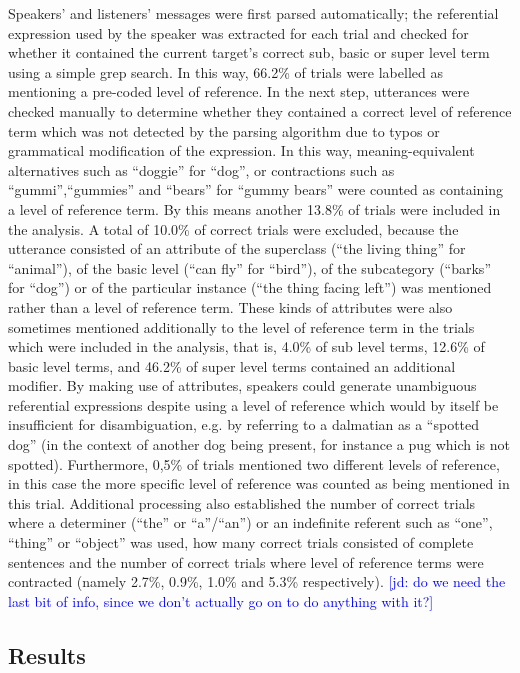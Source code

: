 \documentclass[10pt,letterpaper]{article}
\newcommand{\jd}[1]{\textcolor{Blue}{[jd: #1]}}
\begin{document}
Speakers' and listeners' messages were first parsed automatically; the referential expression used by the speaker was extracted for each trial and checked for whether it contained the current target's correct sub, basic or super level term using a simple grep search. In this way, 66.2\% of trials were labelled as mentioning a pre-coded level of reference. In the next step, utterances were checked manually to determine whether they contained a correct level of reference term which was not detected by the parsing algorithm due to typos or grammatical modification of the expression. In this way, meaning-equivalent alternatives such as ``doggie'' for ``dog'',  or contractions such as ``gummi'',``gummies'' and ``bears'' for ``gummy bears'' were counted as containing a level of reference term. By this means another 13.8\% of trials were included in the analysis. A total of 10.0\% of correct trials were excluded, because the utterance consisted of an attribute of the superclass (``the living thing'' for ``animal''), of the basic level (``can fly'' for ``bird''), of the subcategory (``barks'' for ``dog'') or of the  particular instance (``the thing facing left'') was mentioned rather than a level of reference term. These kinds of attributes were also sometimes mentioned additionally to the level of reference term in the trials which were included in the analysis, that is, 4.0\% of sub level terms, 12.6\% of basic level terms, and 46.2\% of super level terms contained an additional modifier. By making use of attributes,  speakers could generate unambiguous referential expressions despite using a level of reference which would by itself be insufficient for disambiguation, e.g. by referring to a dalmatian as a ``spotted dog'' (in the context of another dog being present, for instance a pug which is not spotted). Furthermore, 0,5\% of trials mentioned two different levels of reference, in this case the more specific level of reference was counted as being mentioned in this trial. Additional processing also established the number of correct trials where a determiner (``the'' or ``a''/``an'') or an indefinite referent such as ``one'', ``thing'' or ``object'' was used, how many correct trials consisted of complete sentences and the number of correct trials where level of reference terms were contracted (namely 2.7\%, 0.9\%, 1.0\% and 5.3\% respectively). \jd{do we need the last bit of info, since we don't actually go on to do anything with it?}


\subsection{\bf Results}
\end{document}
